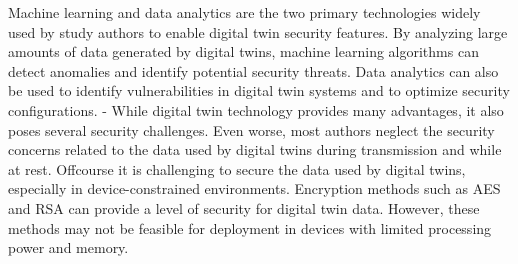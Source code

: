 Machine learning and data analytics are the two primary technologies widely used by study authors to enable digital twin security features. By analyzing large amounts of data generated by digital twins, machine learning algorithms can detect anomalies and identify potential security threats. Data analytics can also be used to identify vulnerabilities in digital twin systems and to optimize security configurations.  
- While digital twin technology provides many advantages, it also poses several security challenges. Even worse, most authors neglect the security concerns related to the data used by digital twins during transmission and while at rest. Offcourse it is challenging to secure the data used by digital twins, especially in device-constrained environments. Encryption methods such as AES and RSA can provide a level of security for digital twin data. However, these methods may not be feasible for deployment in devices with limited processing power and memory.  

